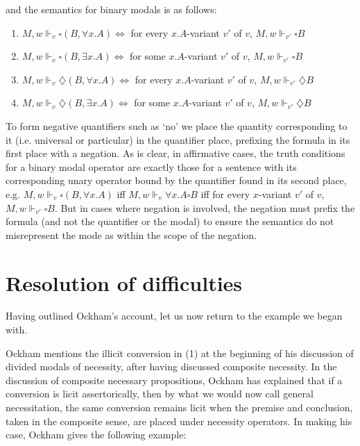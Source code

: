 	and the semantics for binary modals is as follows: 
	\begin{enumerate}
		\item $M, w \Vdash_{v} \square(B, \forall x.A) \Leftrightarrow$ for every $x.A$-variant $v'$ of $v$, $M, w \Vdash_{v'} \square B$
		\item $M, w \Vdash_{v} \square(B, \exists x.A) \Leftrightarrow$ for some $x.A$-variant $v'$ of $v$, $M, w \Vdash _{v'} \square B$
		\item $M, w \Vdash_{v} \diamondsuit(B, \forall x.A) \Leftrightarrow$ for every $x.A$-variant $v'$ of $v$, $M, w \Vdash_{v'} \diamondsuit B$
		\item $M, w \Vdash_{v} \diamondsuit(B, \exists x.A) \Leftrightarrow$ for some $x.A$-variant $v'$ of $v$, $M, w \Vdash _{v'} \diamondsuit B$
	\end{enumerate}
	
	To form negative quantifiers such as `no' we place the quantity corresponding to it (i.e. universal or particular) in the quantifier place, prefixing the formula in its first place with a negation. As is clear, in affirmative cases, the truth conditions for a binary modal operator are exactly those for a sentence with its corresponding unary operator bound by the quantifier found in its second place, e.g. $M, w \Vdash_{v} \square(B, \forall x.A)$ iff $M, w \Vdash_{v} \forall x.A \square B$ iff for every $x$-variant $v'$ of $v$, $M, w \Vdash_{v'} \square B$. But in cases where negation is involved, the negation must prefix the formula (and not the quantifier or the modal) to ensure the semantics do not misrepresent the mode as within the scope of the negation.
	\section{Resolution of difficulties}
	Having outlined Ockham's account, let us now return to the example we began with. 
	
	Ockham mentions the illicit conversion in (1) at the beginning of his discussion of divided modals of necessity, after having discussed composite necessity. In the discussion of composite necessary propositions, Ockham has explained that if a conversion is licit assertorically, then by what we would now call general necessitation, the same conversion remains licit when the premise and conclusion, taken in the composite sense, are placed under necessity operators. In making his case, Ockham gives the following example:
	
